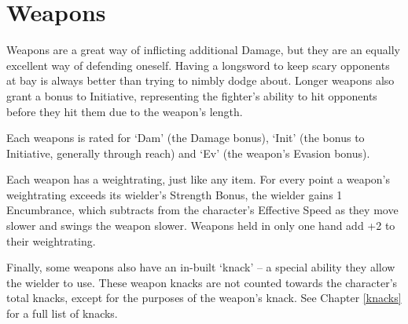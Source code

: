 \section{Weapons}

\begin{multicols}{2}

\noindent
Weapons are a great way of inflicting additional Damage, but they are an equally excellent way of defending oneself. Having a longsword to keep scary opponents at bay is always better than trying to nimbly dodge about. Longer weapons also grant a bonus to Initiative, representing the fighter's ability to hit opponents before they hit them due to the weapon's length.

Each weapons is rated for `Dam' (the Damage bonus), `Init' (the bonus to Initiative, generally through reach) and `Ev' (the weapon's Evasion bonus).

Each weapon has a \gls{weightrating}, just like any item.
For every point a weapon's \gls{weightrating} exceeds its wielder's Strength Bonus, the wielder gains 1 Encumbrance, which subtracts from the character's Effective Speed as they move slower and swings the weapon slower.
Weapons held in only one hand add +2 to their \gls{weightrating}.

Finally, some weapons also have an in-built `knack' -- a special ability they allow the wielder to use.
These weapon knacks are not counted towards the character's total knacks, except for the purposes of the weapon's knack.
See Chapter \ref{knacks} for a full list of knacks.

\end{multicols}

